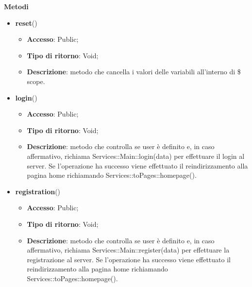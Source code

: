 {{\begin{itemize}
\begin{itemize}
		\end{itemize}
    \end{itemize}
	\textbf{Metodi}
	\begin{itemize}
		\item \textbf{reset}()
		\begin{itemize}
			\item \textbf{Accesso}: Public;
			\item \textbf{Tipo di ritorno}: Void;
			\item \textbf{Descrizione}: metodo che cancella i valori delle variabili all'interno di \$ scope.
		\end{itemize}
		\item \textbf{login}()
		\begin{itemize}
			\item \textbf{Accesso}: Public;
			\item \textbf{Tipo di ritorno}: Void;
			\item \textbf{Descrizione}: metodo che controlla se user è definito e, in caso affermativo, richiama Services::\-Main::\-login(data) per effettuare il login al server. Se l'operazione ha successo viene effettuato il reindirizzamento alla pagina home richiamando Services::\-toPages::\-homepage().
		\end{itemize}
        \item \textbf{registration}()
		\begin{itemize}
			\item \textbf{Accesso}: Public;
			\item \textbf{Tipo di ritorno}: Void;
			\item \textbf{Descrizione}: metodo che controlla se user è definito e, in caso affermativo, richiama Services::\-Main::\-register(data) per effettuare la registrazione al server. Se l'operazione ha successo viene effettuato il reindirizzamento alla pagina home richiamando Services::\-toPages::\-homepage().
		\end{itemize}
	\end{itemize}
}
}
